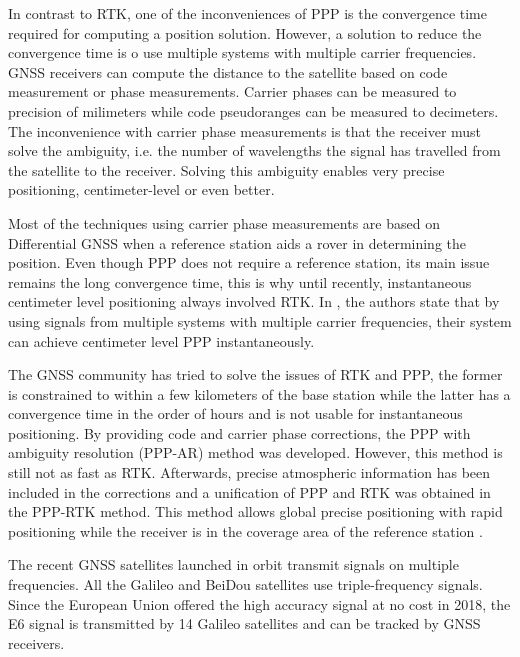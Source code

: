 In contrast to RTK, one of the inconveniences of PPP is the convergence time required for computing a position solution. However, a solution to reduce the convergence time is o use multiple systems with multiple carrier frequencies\cite{instantPPP}. GNSS receivers can compute the distance to the satellite based on code measurement or phase measurements. Carrier phases can be measured to precision of milimeters while code pseudoranges can be measured to decimeters. The inconvenience with carrier phase measurements is that the receiver must solve the ambiguity, i.e. the number of wavelengths the signal has travelled from the satellite to the receiver. Solving this ambiguity enables very precise positioning, centimeter-level or even better. 

Most of the techniques using carrier phase measurements are based on Differential GNSS when a reference station aids a rover in determining the position\cite{instantPPP}. Even though PPP does not require a reference station, its main issue remains the long convergence time, this is why until recently, instantaneous centimeter level positioning always involved RTK. In \cite{instantPPP}, the authors state that by using signals from multiple systems with multiple carrier frequencies, their system can achieve centimeter level PPP instantaneously. 

The GNSS community has tried to solve the issues of RTK and PPP, the former is constrained to within a few kilometers of the base station while the latter has a convergence time in the order of hours and is not usable for instantaneous positioning. By providing code and carrier phase corrections, the PPP with ambiguity resolution (PPP-AR) method was developed. However, this method is still not as fast as RTK\cite{instantPPP}. Afterwards, precise atmospheric information has been included in the corrections and a unification of PPP and RTK was obtained in the PPP-RTK method. This method allows global precise positioning with rapid positioning while the receiver is in the coverage area of the reference station \cite{instantPPP}.

The recent GNSS satellites launched in orbit transmit signals on multiple frequencies. All the Galileo and BeiDou satellites use triple-frequency signals\cite{instantPPP}. Since the European Union offered the high accuracy signal at no cost in 2018, the E6 signal is transmitted by 14 Galileo satellites and can be tracked by GNSS receivers\cite{instantPPP}.

